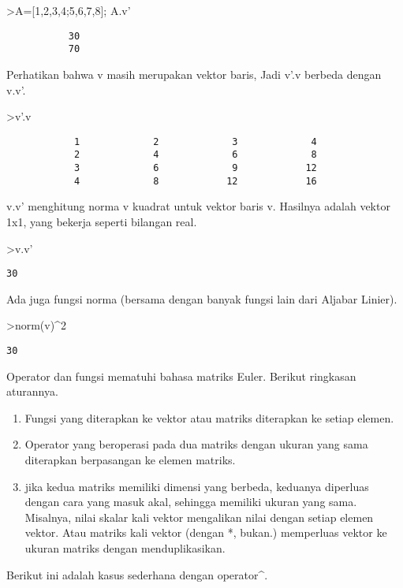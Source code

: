 \documentclass[
]{book}
\providecommand{\tightlist}{%
  \setlength{\itemsep}{0pt}\setlength{\parskip}{0pt}}
\begin{document}
\textgreater A={[}1,2,3,4;5,6,7,8{]}; A.v'

\begin{verbatim}
           30 
           70 
\end{verbatim}

Perhatikan bahwa v masih merupakan vektor baris, Jadi v'.v berbeda dengan v.v'.

\textgreater v'.v

\begin{verbatim}
            1             2             3             4 
            2             4             6             8 
            3             6             9            12 
            4             8            12            16 
\end{verbatim}

v.v' menghitung norma v kuadrat untuk vektor baris v. Hasilnya adalah vektor 1x1, yang bekerja seperti bilangan real.

\textgreater v.v'

\begin{verbatim}
30
\end{verbatim}

Ada juga fungsi norma (bersama dengan banyak fungsi lain dari Aljabar Linier).

\textgreater norm(v)\^{}2

\begin{verbatim}
30
\end{verbatim}

Operator dan fungsi mematuhi bahasa matriks Euler. Berikut ringkasan aturannya.

\begin{enumerate}
\def\labelenumi{\arabic{enumi}.}
\tightlist
\item
  Fungsi yang diterapkan ke vektor atau matriks diterapkan ke setiap elemen.
\item
  Operator yang beroperasi pada dua matriks dengan ukuran yang sama diterapkan berpasangan ke elemen matriks.
\item
  jika kedua matriks memiliki dimensi yang berbeda, keduanya diperluas dengan cara yang masuk akal, sehingga memiliki ukuran yang sama. Misalnya, nilai skalar kali vektor mengalikan nilai dengan setiap elemen vektor. Atau matriks kali vektor (dengan *, bukan.) memperluas vektor ke ukuran matriks dengan menduplikasikan.
\end{enumerate}

Berikut ini adalah kasus sederhana dengan operator\^{}.
\end{document}

